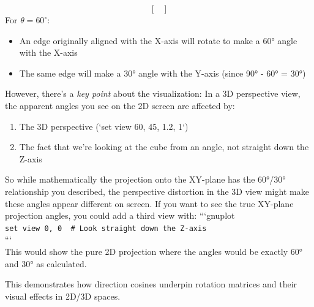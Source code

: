 \documentclass[a4paper,10pt]{article}
\begin{document}
\begin{enumerate}
\[\begin{bmatrix}
\end{bmatrix}
\]
For \(\theta = 60^{\circ}\):
\begin{itemize}
\item An edge originally aligned with the X-axis will rotate to make a 60° angle with the X-axis
\item The same edge will make a 30° angle with the Y-axis (since 90° - 60° = 30°)
\end{itemize}
However, there's a \emph{key point} about the visualization: In a 3D perspective view, the apparent angles you see on the 2D screen are affected by:
\begin{enumerate}
\item The 3D perspective (`set view 60, 45, 1.2, 1`)
\item The fact that we're looking at the cube from an angle, not straight down the Z-axis
\end{enumerate}
So while mathematically the projection onto the XY-plane has the 60°/30° relationship you described, the perspective distortion in the 3D view might make these angles appear different on screen.
If you want to see the true XY-plane projection angles, you could add a third view with:
```gnuplot\\
\verb|set view 0, 0  # Look straight down the Z-axis|\\
```\\
This would show the pure 2D projection where the angles would be exactly 60° and 30° as calculated.
\end{enumerate}
This demonstrates how direction cosines underpin rotation matrices and their visual effects in
2D/3D spaces.
\end{document}
